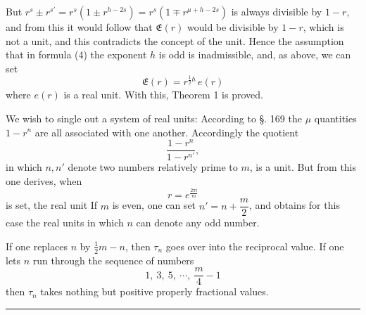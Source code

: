 But $r^s \pm r^{s'} = r^s (1 \pm r^{h-2s}) = r^s (1 \mp r^{\mu+h-2s})$ is always divisible by $1 - r$, and from this it would follow that $\mathfrak{E}(r)$ would be divisible by $1 - r$, which is not a unit, and this contradicts the concept of the unit. Hence the assumption that in formula (4) the exponent $h$ is odd is inadmissible, and, as above, we can set
\[
\mathfrak{E}(r) = r^{\tfrac12 h}\, e(r)
\]
where $e(r)$ is a real unit. With this, Theorem 1 is proved.

We wish to single out a system of real units: According to §. 169 the $\mu$ quantities $1 - r^n$ are all associated with one another. Accordingly the quotient
\[
\frac{1 - r^n}{1 - r^{n'}},
\]
in which $n, n'$ denote two numbers relatively prime to $m$, is a unit. But from this one derives, when
\[
r = e^{\frac{2\pi i}{m}}
\]
is set, the real unit
If $m$ is even, one can set $n' = n + \dfrac{m}{2}$, and obtains for this case the real units
in which $n$ can denote any odd number.

If one replaces $n$ by $\tfrac{1}{2} m - n$, then $\tau_n$ goes over into the reciprocal value. If one lets $n$ run through the sequence of numbers
\[
1,\ 3,\ 5,\ \cdots,\ \frac{m}{4} - 1
\]
then $\tau_n$ takes nothing but positive properly fractional values.

\begin{center}
\rule{0.2\linewidth}{0.4pt}
\end{center}
